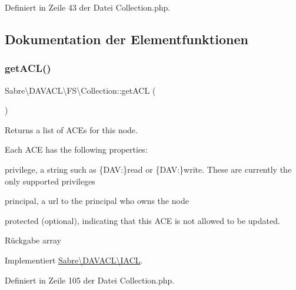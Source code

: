 Definiert in Zeile 43 der Datei Collection.\+php.



\subsection{Dokumentation der Elementfunktionen}
\mbox{\label{class_sabre_1_1_d_a_v_a_c_l_1_1_f_s_1_1_collection_abf277bc82822cb13082a5e2625676cf8}} 
\subsubsection{\texorpdfstring{get\+A\+C\+L()}{getACL()}}
{\footnotesize\ttfamily Sabre\textbackslash{}\+D\+A\+V\+A\+C\+L\textbackslash{}\+F\+S\textbackslash{}\+Collection\+::get\+A\+CL (\begin{DoxyParamCaption}{ }\end{DoxyParamCaption})}

Returns a list of A\+CE\textquotesingle{}s for this node.

Each A\+CE has the following properties\+:
\begin{DoxyItemize}
\item \textquotesingle{}privilege\textquotesingle{}, a string such as \{D\+AV\+:\}read or \{D\+AV\+:\}write. These are currently the only supported privileges
\item \textquotesingle{}principal\textquotesingle{}, a url to the principal who owns the node
\item \textquotesingle{}protected\textquotesingle{} (optional), indicating that this A\+CE is not allowed to be updated.
\end{DoxyItemize}

\begin{DoxyReturn}{Rückgabe}
array 
\end{DoxyReturn}


Implementiert \mbox{\hyperlink{interface_sabre_1_1_d_a_v_a_c_l_1_1_i_a_c_l_a8fe3b3a5b48eae789d7eb722b340045c}{Sabre\textbackslash{}\+D\+A\+V\+A\+C\+L\textbackslash{}\+I\+A\+CL}}.



Definiert in Zeile 105 der Datei Collection.\+php.

